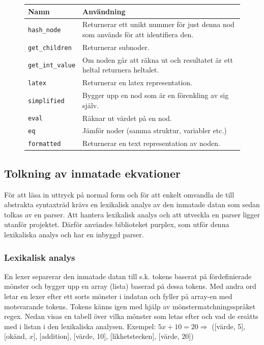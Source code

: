\documentclass[12pt,a4paper]{article}
\begin{document}
\begin{figure}[h!]
  \centering
  \begin{tabular}{l|p{10cm}}
    \textbf{Namn} & \textbf{Användning} \\
    \hline
    \texttt{hash\_node} & Returnerar ett unikt nummer för just denna nod som används för att identifiera den. \\
    \texttt{get\_children} & Returnerar subnoder. \\
    \texttt{get\_int\_value} & Om noden går att räkna ut och resultatet är ett heltal returnera heltalet. \\
    \texttt{latex} & Returnerar en latex representation. \\
    \texttt{simplified} & Bygger upp en nod som är en förenkling av sig själv. \\
    \texttt{eval} & Räknar ut värdet på en nod. \\
    \texttt{eq} & Jämför noder (samma struktur, variabler etc.) \\
    \texttt{formatted} & Returnerar en text representation av noden.
  \end{tabular}
   \label{tab:basenodefunc}
\end{figure}

\subsection{Tolkning av inmatade ekvationer}
För att läsa in uttryck på normal form och för att enkelt omvandla de till abstrakta syntaxträd krävs en lexikalisk analys av den inmatade datan som sedan tolkas av en parser. Att hantera lexikalisk analys och att utveckla en parser ligger utanför projektet. Därför användes biblioteket purplex, som utför denna lexikaliska analys och har en inbyggd parser.

\subsubsection{Lexikalisk analys}
\label{subsubsec:lexikaliskanal}
En lexer separerar den inmatade datan till s.k. tokens baserat på fördefinierade mönster och bygger upp en array (lista) baserad på dessa tokens. Med andra ord letar en lexer efter ett sorts mönster i indatan och fyller på array-en med motsvarande tokens. Tokens känns igen med hjälp av mönstermatchningsspråket regex. Nedan visas en tabell över vilka mönster som letas efter och vad de ersätts med i listan i den lexikaliska analysen. 
Exempel: \(5x+10=20\Rightarrow\) ([värde, 5], [okänd, \(x\)], [addition], [värde, 10], [likhetstecken], [värde, 20])
\end{document}
